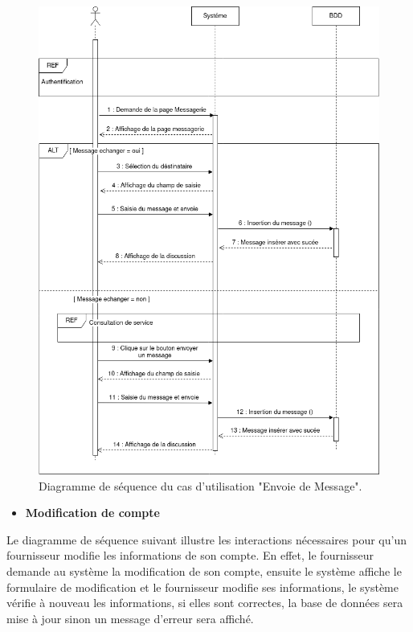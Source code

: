 \documentclass[french]{report}
\begin{document}
    \begin{figure}[H]
            \centering
            \includegraphics[width=1\textwidth]{images/Seq Diag Envoie Message.png}
            \caption{Diagramme de séquence du cas d'utilisation "Envoie de Message".}
            \label{Seq Diag Envoie message}
    \end{figure}
    
    \begin{itemize}
            \item \textbf{Modification de compte}
        \end{itemize}
        Le diagramme de séquence suivant illustre les interactions nécessaires pour qu'un fournisseur modifie les 
	informations de son compte. En effet, le fournisseur  demande au système la modification de son compte,
	ensuite le système affiche le formulaire de modification et le fournisseur  modifie ses informations,
	le système vérifie à nouveau les informations, si elles sont correctes, la base de données sera 
	mise à jour sinon un message d'erreur sera affiché.
    
\end{document}
